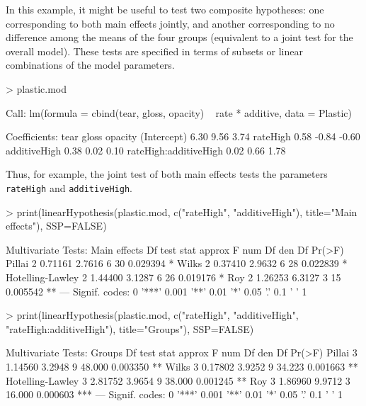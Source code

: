 \documentclass[11pt]{article}
\newcommand{\code}[1]{{\texttt{#1}}}
\begin{document}
In this example, it might be useful to test two composite hypotheses:
one corresponding to both main effects jointly, and another corresponding
to no difference among the means of the four groups (equivalent to
a joint test for the overall model). These tests are specified in terms
of subsets or linear combinations of the model parameters.
\begin{Schunk}
\begin{Sinput}
> plastic.mod
\end{Sinput}
\begin{Soutput}
Call:
lm(formula = cbind(tear, gloss, opacity) ~ rate * additive, data = Plastic)

Coefficients:
                       tear   gloss  opacity
(Intercept)             6.30   9.56   3.74  
rateHigh                0.58  -0.84  -0.60  
additiveHigh            0.38   0.02   0.10  
rateHigh:additiveHigh   0.02   0.66   1.78  
\end{Soutput}
\end{Schunk}
Thus, for example, the joint test of both main effects tests the parameters
\code{rateHigh} and \code{additiveHigh}.
\begin{Schunk}
\begin{Sinput}
> print(linearHypothesis(plastic.mod, c("rateHigh", "additiveHigh"), title="Main effects"), SSP=FALSE)
\end{Sinput}
\begin{Soutput}
Multivariate Tests: Main effects
                 Df test stat approx F num Df den Df   Pr(>F)   
Pillai            2   0.71161   2.7616      6     30 0.029394 * 
Wilks             2   0.37410   2.9632      6     28 0.022839 * 
Hotelling-Lawley  2   1.44400   3.1287      6     26 0.019176 * 
Roy               2   1.26253   6.3127      3     15 0.005542 **
---
Signif. codes:  0 '***' 0.001 '**' 0.01 '*' 0.05 '.' 0.1 ' ' 1 
\end{Soutput}
\begin{Sinput}
> print(linearHypothesis(plastic.mod, c("rateHigh", "additiveHigh", "rateHigh:additiveHigh"), title="Groups"), SSP=FALSE)
\end{Sinput}
\begin{Soutput}
Multivariate Tests: Groups
                 Df test stat approx F num Df den Df   Pr(>F)    
Pillai            3   1.14560   3.2948      9 48.000 0.003350 ** 
Wilks             3   0.17802   3.9252      9 34.223 0.001663 ** 
Hotelling-Lawley  3   2.81752   3.9654      9 38.000 0.001245 ** 
Roy               3   1.86960   9.9712      3 16.000 0.000603 ***
---
Signif. codes:  0 '***' 0.001 '**' 0.01 '*' 0.05 '.' 0.1 ' ' 1 
\end{Soutput}
\end{Schunk}
\end{document}

